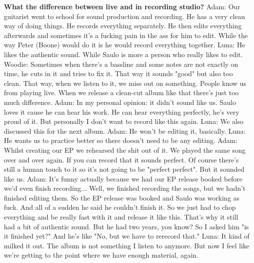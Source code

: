 \textbf{What the difference between live and in recording studio?}
\newline Adam: Our guitarist went to school for sound production and recording. He has a very clean way of doing things. He records everything separately.
He then edits everything afterwards and sometimes it's a fucking pain in the ass for him to edit.
While the way Peter (Boone) would do it is he would record everything together.
\newline Luna: He likes the authentic sound. While Saulo is more a person who really likes to edit.
\newline Woodie: Sometimes when there's a bassline and some notes are not exactly on time, he cuts in it and tries to fix it. That way it sounds "good" but also too clean.
That way, when we listen to it, we miss out on something. People know us from playing live. When we release a clean-cut album like that there's just too much difference.
\newline Adam: In my personal opinion: it didn't sound like us. Saulo loves it cause he can hear his work. He can hear everything perfectly, he's very proud of it.
But personally I don't want to record like this again.
\newline Luna: We also discussed this for the next album.
\newline Adam: He won't be editing it, basically.
\newline Luna: He wants us to practice better so there doesn't need to be any editing.
\newline Adam: Whilst creating our EP we rehearsed the shit out of it. We played the same song over and over again. If you can record that it sounds perfect.
Of course there's still a human touch to it so it's not going to be "perfect perfect". But it sounded like us.
\newline Adam: It's funny actually because we had our EP release booked before we'd even finish recording... Well, we finished recording the songs, but we hadn't finished editing them.
So the EP release was booked and Saulo was working as fuck. And all of a sudden he said he couldn't finish it.
So we just had to chop everything and be really fast with it and release it like this. That's why it still had a bit of authentic sound.
But he had two years, you know? So I asked him "is it finished yet?" And he's like "No, but we have to rerecord that."
\newline Luna: It kind of milked it out. The album is not something I listen to anymore. But now I feel like we're getting to the point where we have enough material, again.
